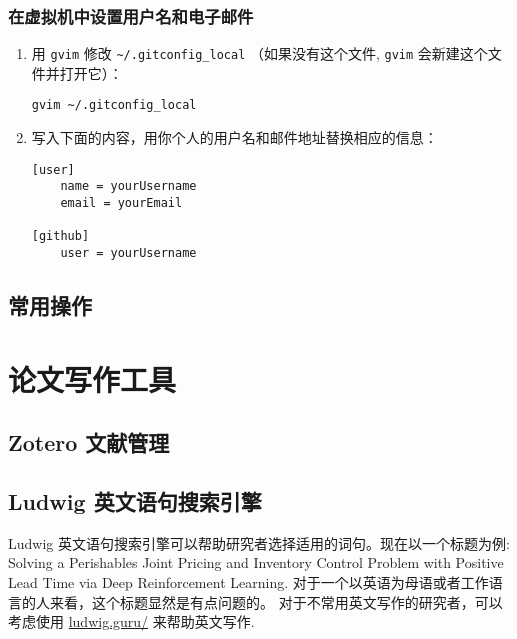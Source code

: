 \documentclass[cn,11pt, simple]{elegantbook}
\begin{document}
\subsection{在虚拟机中设置用户名和电子邮件}%
\label{sub:git-user-info}

\begin{enumerate}
    \item 用 \lstinline{gvim} 修改 \lstinline{~/.gitconfig_local}
        （如果没有这个文件, \lstinline{gvim} 会新建这个文件并打开它）：
\begin{lstlisting}[escapeinside=``]
gvim ~/.gitconfig_local
\end{lstlisting}
    \item 写入下面的内容，用你个人的用户名和邮件地址替换相应的信息：
\begin{lstlisting}[escapeinside=``]
[user]
	name = yourUsername
	email = yourEmail

[github]
	user = yourUsername
\end{lstlisting}
\end{enumerate}

%
%
%
%
\section{常用操作}%
\label{sec:git-tips}
%

\chapter{论文写作工具}%
\label{cha:tools-writing}

\section{Zotero 文献管理}%
\label{sec:citation-zotero}

\section{Ludwig 英文语句搜索引擎}%
\label{sec:writing-ludwig}

Ludwig 英文语句搜索引擎可以帮助研究者选择适用的词句。现在以一个标题为例:
Solving a Perishables Joint Pricing and Inventory Control Problem
with Positive Lead Time via Deep Reinforcement Learning.
对于一个以英语为母语或者工作语言的人来看，这个标题显然是有点问题的。
对于不常用英文写作的研究者，可以考虑使用
\href{https://ludwig.guru/}{ludwig.guru/} 来帮助英文写作.
\end{document}
